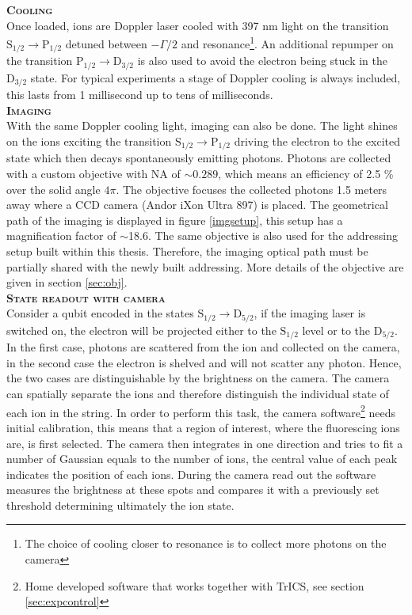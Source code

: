 \textbf{\textsc{Cooling}}\\
Once loaded, ions are Doppler laser cooled with 397 nm light on the transition $\text{S}_{1/2} \to \text{P}_{1/2}$ detuned between $-\Gamma/2$ and resonance\footnote{The choice of cooling closer to resonance is to collect more photons on the camera}. An additional repumper on the transition $\text{P}_{1/2} \to \text{D}_{3/2}$ is also used to avoid the electron being stuck in the $\text{D}_{3/2}$ state. For typical experiments a stage of Doppler cooling is always included, this lasts from 1 millisecond up to tens of milliseconds.\vspace{.5em}\\
\textbf{\textsc{Imaging}}\\
With the same Doppler cooling light, imaging can also be done. The light shines on the ions exciting the transition $\text{S}_{1/2} \to \text{P}_{1/2}$ driving the electron to the excited state which then decays spontaneously emitting photons. Photons are collected with a custom objective with NA of $\sim 0.289$, which means an efficiency of 2.5 \% over the solid angle $4\pi$. The objective focuses the collected photons 1.5 meters away where a CCD camera (Andor iXon Ultra 897) is placed. The geometrical path of the imaging is displayed in figure \ref{imgsetup}, this setup has a magnification factor of $\sim$18.6. The same objective is also used for the addressing setup built within this thesis. Therefore, the imaging optical path must be partially shared with the newly built addressing. More details of the objective are given in section \ref{sec:obj}.\vspace{.5em}\\
\textbf{\textsc{State readout with camera}}\\
Consider a qubit encoded in the states $\text{S}_{1/2} \to \text{D}_{5/2}$, if the imaging laser is switched on, the electron will be projected either to the $\text{S}_{1/2}$ level or to the $\text{D}_{5/2} $. In the first case, photons are scattered from the ion and collected on the camera, in the second case the electron is shelved and will not scatter any photon. Hence, the two cases are distinguishable by the brightness on the camera. The camera can spatially separate the ions and therefore distinguish the individual state of each ion in the string. In order to perform this task, the camera software\footnote{Home developed software that works together with TrICS, see section \ref{sec:expcontrol}} needs initial calibration, this means that a region of interest, where the fluorescing ions are, is first selected. The camera then integrates in one direction and tries to fit a number of Gaussian equals to the number of ions, the central value of each peak indicates the position of each ions. During the camera read out the software measures the brightness at these spots and compares it with a previously set threshold determining ultimately the ion state.

